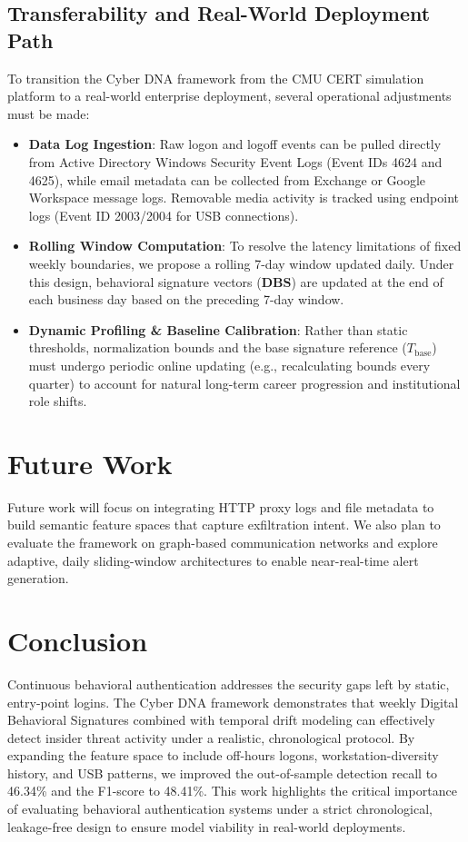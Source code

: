 \documentclass[pdflatex,sn-mathphys-num]{sn-jnl}
\theoremstyle{thmstyleone}
\theoremstyle{thmstyletwo}
\theoremstyle{thmstylethree}
\begin{document}
\subsection{Transferability and Real-World Deployment Path}\label{subsec7_1}
To transition the Cyber DNA framework from the CMU CERT simulation platform to a real-world enterprise deployment, several operational adjustments must be made:
\begin{itemize}
    \item \textbf{Data Log Ingestion}: Raw logon and logoff events can be pulled directly from Active Directory Windows Security Event Logs (Event IDs 4624 and 4625), while email metadata can be collected from Exchange or Google Workspace message logs. Removable media activity is tracked using endpoint logs (Event ID 2003/2004 for USB connections).
    \item \textbf{Rolling Window Computation}: To resolve the latency limitations of fixed weekly boundaries, we propose a rolling 7-day window updated daily. Under this design, behavioral signature vectors ($\mathbf{DBS}$) are updated at the end of each business day based on the preceding 7-day window.
    \item \textbf{Dynamic Profiling & Baseline Calibration}: Rather than static thresholds, normalization bounds and the base signature reference ($T_{\text{base}}$) must undergo periodic online updating (e.g., recalculating bounds every quarter) to account for natural long-term career progression and institutional role shifts.
\end{itemize}

\section{Future Work}\label{sec8}
Future work will focus on integrating HTTP proxy logs and file metadata to build semantic feature spaces that capture exfiltration intent. We also plan to evaluate the framework on graph-based communication networks and explore adaptive, daily sliding-window architectures to enable near-real-time alert generation.

\section{Conclusion}\label{sec9}
Continuous behavioral authentication addresses the security gaps left by static, entry-point logins. The Cyber DNA framework demonstrates that weekly Digital Behavioral Signatures combined with temporal drift modeling can effectively detect insider threat activity under a realistic, chronological protocol. By expanding the feature space to include off-hours logons, workstation-diversity history, and USB patterns, we improved the out-of-sample detection recall to 46.34\% and the F1-score to 48.41\%. This work highlights the critical importance of evaluating behavioral authentication systems under a strict chronological, leakage-free design to ensure model viability in real-world deployments.
\end{document}
